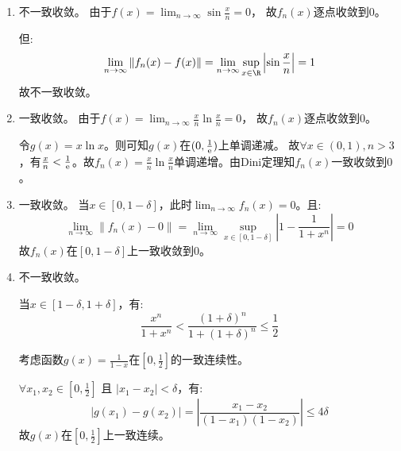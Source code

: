 \begin{solution}
    \begin{enumerate}
        \item 不一致收敛。
            由于\(f(x)=\lim_{n \to \infty} \sin \frac{x}{n} = 0\)，
            故\(f_{n}(x)\)逐点收敛到\(0\)。

            但:
            \[
                \lim_{n \to \infty} \left\lVert f_{n}(x) -
                f(x) \right\rVert
                = \lim_{n \to \infty} \sup_{x \in
                \R} \left\lvert \sin
                \frac{x}{n} \right\rvert
                = 1
            \]
            故不一致收敛。

        \item 一致收敛。
            由于\(f(x)=\lim_{n \to \infty} \frac{x}{n} \ln
            \frac{x}{n} = 0\)，
            故\(f_{n}(x)\)逐点收敛到\(0\)。

            令\(g(x)=x \ln x\)。则可知\(g(x)\)在\((0,\frac{1}{\mathrm{e}})\)上单调递减。
            故\(\forall x \in (0,1), n > 3\)，有\(\frac{x}{n} <
            \frac{1}{\mathrm{e}}\)。故\(f_{n}(x) = \frac{x}{n} \ln
            \frac{x}{n}\)单调递增。由Dini定理知\(f_{n}(x)\)一致收敛到\(0\)。

        \item 一致收敛。
            当\(x \in [0,1-\delta]\)，此时\(\lim_{n \to
            \infty}f_{n}(x) = 0\)。且:
            \[
                \lim_{n \to \infty}\left\lVert f_{n}(x) - 0
                \right\rVert
                = \lim_{n \to \infty} \sup_{x \in
                [0,1-\delta]} \left\vert 1 -
                \frac{1}{1+ x^{n}} \right\vert
                = 0
            \]
            故\(f_{n}(x)\)在\([0,1-\delta]\)上一致收敛到\(0\)。

        \item 不一致收敛。

            当\(x \in [1-\delta,1+\delta]\)，有:
            \[
                \frac{x^{n}}{1 + x^{n}} < \frac{(1+\delta)^{n}}{1+
                (1+\delta)^{n}} \le \frac{1}{2}
            \]

            考虑函数\(g(x) = \frac{1}{1-x}\)在\([0,\frac{1}{2}]\)的一致连续性。

            \(\forall x_1, x_2 \in [0, \frac{1}{2}]\) 且
            \(\left\vert x_1 - x_2
            \right\vert < \delta\)，有:
            \[
                \left\vert g(x_1) - g(x_2) \right\vert
                = \left\vert \frac{x_1 -
                x_2}{(1-x_1)(1-x_2)} \right\vert
                \le 4 \delta
            \]
            故\(g(x)\)在\([0,\frac{1}{2}]\)上一致连续。


\end{enumerate}
\end{solution}
